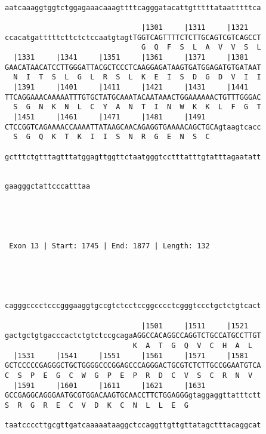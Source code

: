 \documentclass{article}
\begin{document}
\begin{Verbatim}
                                                            
aatcaaaggtggtctggagaaacaaagttttcagggatacattgtttttataatttttca
                                                            
                                |1301     |1311     |1321   
ccacatgatttttcttctctccaatgtagtTGGTCAGTTTTCTCTTGCAGTCGTCAGCCT
                                G  Q  F  S  L  A  V  V  S  L
  |1331     |1341     |1351     |1361     |1371     |1381   
GAACATAACATCCTTGGGATTACGCTCCCTCAAGGAGATAAGTGATGGAGATGTGATAAT
  N  I  T  S  L  G  L  R  S  L  K  E  I  S  D  G  D  V  I  I
  |1391     |1401     |1411     |1421     |1431     |1441   
TTCAGGAAACAAAAATTTGTGCTATGCAAATACAATAAACTGGAAAAAACTGTTTGGGAC
  S  G  N  K  N  L  C  Y  A  N  T  I  N  W  K  K  L  F  G  T
  |1451     |1461     |1471     |1481     |1491             
CTCCGGTCAGAAAACCAAAATTATAAGCAACAGAGGTGAAAACAGCTGCAgtaagtcacc
  S  G  Q  K  T  K  I  I  S  N  R  G  E  N  S  C            
                                                            
gctttctgtttagtttatggagttggttctaatgggtcctttatttgtatttagaatatt
                                                            
                    
gaagggctattcccatttaa
                    




 Exon 13 | Start: 1745 | End: 1877 | Length: 132 




                                                            
cagggcccctcccgggaaggtgccgtctcctccggcccctcgggtccctgctctgtcact
                                                            
                                |1501     |1511     |1521   
gactgctgtgacccactctgtctccgcagaAGGCCACAGGCCAGGTCTGCCATGCCTTGT
                              K  A  T  G  Q  V  C  H  A  L  
  |1531     |1541     |1551     |1561     |1571     |1581   
GCTCCCCCGAGGGCTGCTGGGGCCCGGAGCCCAGGGACTGCGTCTCTTGCCGGAATGTCA
C  S  P  E  G  C  W  G  P  E  P  R  D  C  V  S  C  R  N  V  
  |1591     |1601     |1611     |1621     |1631             
GCCGAGGCAGGGAATGCGTGGACAAGTGCAACCTTCTGGAGGGgtaggaggttatttctt
S  R  G  R  E  C  V  D  K  C  N  L  L  E  G                 
                                                            
taatccccttgcgttgatcaaaaataaggctccaggttgttgttatagctttacaggcat
                                                            

\end{Verbatim}
\end{document}
